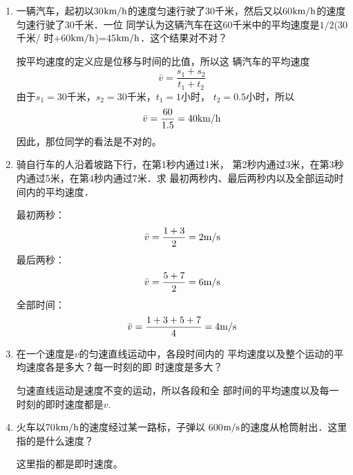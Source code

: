 \begin{enumerate}
    \item 一辆汽车，起初以30$\text{km}/\text{h}$的速度匀速行驶了30千米，然后又以60$\text{km}/\text{h}$的速度匀速行驶了30千米．一位
    同学认为这辆汽车在这60千米中的平均速度是$1/2$(30千米/
    时+60$\text{km}/\text{h}$)=45$\text{km}/\text{h}$．这个结果对不对？

\begin{solution}
    按平均速度的定义应是位移与时间的比值，所以这
辆汽车的平均速度
\[\bar v=\frac{s_1+s_2}{t_1+t_2}\]
由于$s_1=30$千米，$s_2=30$千米，$t_1=1$小时，
$t_2=0.5$小时，所以
\[\bar v=\frac{60}{1.5}=40\text{km}/\text{h}\]
因此，那位同学的看法是不对的。
\end{solution}
    \item 骑自行车的人沿着坡路下行，在第1秒内通过1米，
    第2秒内通过3米，在第3秒内通过5米，在第4秒内通过7米．求
    最初两秒内、最后两秒内以及全部运动时间内的平均速度．

    \begin{solution}
最初两秒：
\[\bar v=\frac{1+3}{2}=2\text{m}/\text{s}\]
最后两秒：
\[\bar v=\frac{5+7}{2}=6\text{m}/\text{s}\]
全部时间：
\[\bar v=\frac{1+3+5+7}{4}=4\text{m}/\text{s}\]
    \end{solution}
    \item 在一个速度是$v$的匀速直线运动中，各段时间内的
    平均速度以及整个运动的平均速度各是多大？每一时刻的即
    时速度是多大？

    \begin{solution}
        匀速直线运动是速度不变的运动，所以各段和全
部时间的平均速度以及每一时刻的即时速度都是$v$. 
    \end{solution}
    \item 火车以70$\text{km}/\text{h}$的速度经过某一路标，子弹以
    600$\text{m}/\text{s}$的速度从枪筒射出．这里指的是什么速度？
    
\begin{solution}
    这里指的都是即时速度。
\end{solution}
\end{enumerate}

